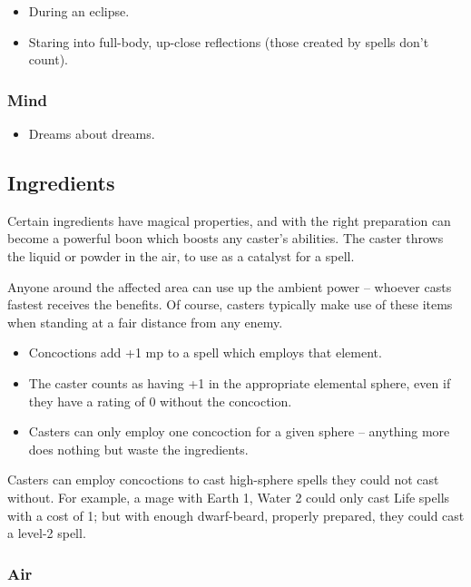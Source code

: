 \begin{multicols}{2}
\begin{itemize}
  \item
  During an eclipse.
  \item
  Staring into full-body, up-close reflections (those created by spells don't count).
\end{itemize}

\subsubsection{Mind}

\begin{itemize}
  \item
  Dreams about dreams.
\end{itemize}

\subsection{Ingredients}
\label{magicIngredients}

Certain ingredients have magical properties, and with the right preparation can become a powerful \gls{boon} which boosts any caster's abilities.
The caster throws the liquid or powder in the air, to use as a catalyst for a spell.

Anyone around the affected area can use up the ambient power -- whoever casts fastest receives the benefits.
Of course, casters typically make use of these items when standing at a fair distance from any enemy.

\begin{itemize}
  \item
  Concoctions add +1 \gls{mp} to a spell which employs that element.
  \item
  The caster counts as having +1 in the appropriate elemental sphere, even if they have a rating of 0 without the concoction.
  \item
  Casters can only employ one concoction for a given sphere -- anything more does nothing but waste the ingredients.
\end{itemize}

Casters can employ concoctions to cast high-sphere spells they could not cast without.
For example, a mage with Earth 1, Water 2 could only cast Life spells with a cost of 1; but with enough dwarf-beard, properly prepared, they could cast a level-2 spell.

\subsubsection{Air}


\end{multicols}

